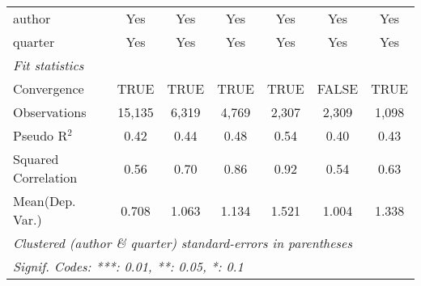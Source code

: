 \begin{tabular}{lcccccc}
   author                                                     & Yes            & Yes          & Yes         & Yes          & Yes            & Yes\\  
   quarter                                                    & Yes            & Yes          & Yes         & Yes          & Yes            & Yes\\  
   \midrule
   \emph{Fit statistics}\\
   Convergence                                                &TRUE            & TRUE         & TRUE        & TRUE         & FALSE          & TRUE\\  
   Observations                                               & 15,135         & 6,319        & 4,769       & 2,307        & 2,309          & 1,098\\  
   Pseudo R$^2$                                               & 0.42           & 0.44         & 0.48        & 0.54         & 0.40           & 0.43\\  
   Squared Correlation                                        & 0.56           & 0.70         & 0.86        & 0.92         & 0.54           & 0.63\\  
Mean(Dep. Var.) & 0.708 & 1.063 & 1.134 & 1.521 & 1.004 & 1.338 \\
   \midrule \midrule
   \multicolumn{7}{l}{\emph{Clustered (author \& quarter) standard-errors in parentheses}}\\
   \multicolumn{7}{l}{\emph{Signif. Codes: ***: 0.01, **: 0.05, *: 0.1}}\\
\end{tabular}
\par\endgroup
